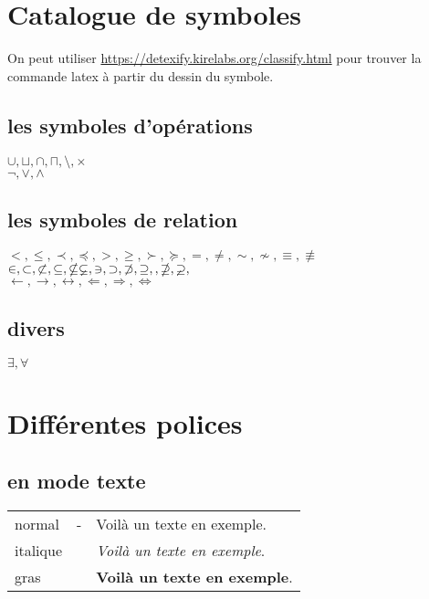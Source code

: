 \documentclass[12pt,a4paper,fleqn]{article}
\begin{document}
\section{Catalogue de symboles}
On peut utiliser \url{https://detexify.kirelabs.org/classify.html} pour trouver la commande latex à partir du dessin du symbole.

\subsection{les symboles d'opérations}
$\cup, \sqcup, \cap, \sqcap,\setminus, \times $\\
$\lnot,\vee,\wedge$%


\subsection{les symboles de relation}
$ <,\leqslant,\prec,\preccurlyeq, >,\geqslant,\succ, \succcurlyeq, =, \neq ,\sim, \not\sim, \equiv, \not\equiv$\\
$\in, \subset, \not\subset, \subseteq,\nsubseteq \varsubsetneq,
\ni, \supset, \not\supset, \supseteq, ,\nsupseteq, \varsupsetneq,$\\
$\leftarrow, \rightarrow, \leftrightarrow, \Leftarrow, \Rightarrow, \Leftrightarrow$

\subsection{divers}
$\exists, \forall$

\section{Différentes polices}
\subsection{en mode texte}
\begin{tabular}{lll}
normal & - &Voilà un texte en exemple.\\
italique & \texttt{\textit} & \textit{Voilà un texte en exemple}.\\
gras & \texttt{\textbf} & \textbf{Voilà un texte en exemple}.
\end{tabular}
\end{document}
